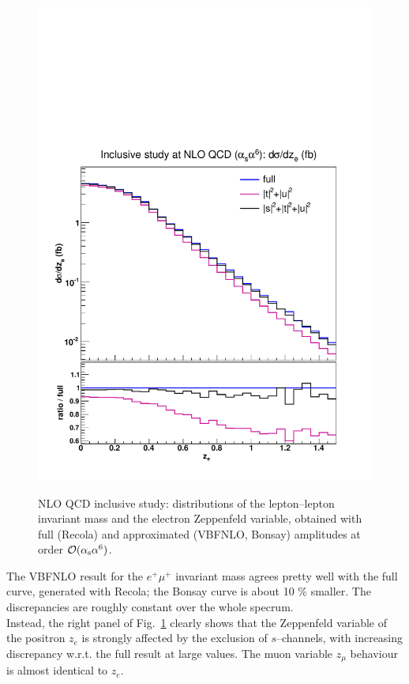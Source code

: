 \begin{figure}[hbt]
{\includegraphics[scale=0.35]{figures/scanfigures/zel_nlo.pdf}}
\caption{NLO QCD inclusive study: distributions of the lepton--lepton invariant mass and the electron Zeppenfeld variable, obtained with full ({\sc Recola}) and approximated ({\sc VBFNLO, Bonsay}) amplitudes at order $\mathcal{O}(\alpha_\text{s}\alpha^6)$.} \label{fig:mjjdyjj_1d_3}
\end{figure}
The {\sc VBFNLO} result for the $e^+\mu^+$ invariant mass agrees pretty well with the full curve, generated with {\sc Recola}; the {\sc Bonsay} curve is about 10 \% smaller. The discrepancies are roughly constant over the whole specrum.\\
Instead, the right panel of Fig.~\ref{fig:mjjdyjj_1d_3} clearly shows that the Zeppenfeld variable of the positron $z_e$ is strongly affected by the exclusion of $s$--channels, with increasing discrepancy w.r.t. the full result at large values. The muon variable $z_{\mu}$ behaviour is almost identical to $z_e$.\\

